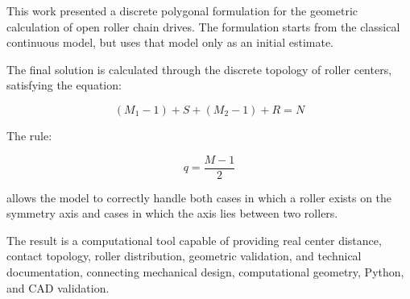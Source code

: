 \documentclass[12pt,a4paper]{article}
\begin{document}
This work presented a discrete polygonal formulation for the geometric calculation of open roller chain drives. The formulation starts from the classical continuous model, but uses that model only as an initial estimate.

The final solution is calculated through the discrete topology of roller centers, satisfying the equation:

\begin{equation}
(M_1-1)+S+(M_2-1)+R=N
\end{equation}

The rule:

\begin{equation}
q=\frac{M-1}{2}
\end{equation}

allows the model to correctly handle both cases in which a roller exists on the symmetry axis and cases in which the axis lies between two rollers.

The result is a computational tool capable of providing real center distance, contact topology, roller distribution, geometric validation, and technical documentation, connecting mechanical design, computational geometry, Python, and CAD validation.
\end{document}
